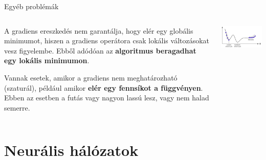 \documentclass[english, aspectratio=169]{beamer}
\makeatletter
\let\origtableofcontents=\tableofcontents
\def\tableofcontents{\@ifnextchar[{\origtableofcontents}{\gobbletableofcontents}}
\def\gobbletableofcontents#1{\origtableofcontents}
\makeatother
\begin{document}
\begin{frame}{Egyéb problémák}
	\begin{columns}
		\begin{column}{.5\textwidth}
			A gradiens ereszkedés nem garantálja, hogy elér egy globális minimumot, hiszen a gradiens operátora csak lokális változásokat vesz figyelembe. Ebből adódóan az \textbf{algoritmus beragadhat egy lokális minimumon}.\par\medskip
			Vannak esetek, amikor a gradiens nem meghatározható (szaturál), például amikor \textbf{elér egy fennsíkot a függvényen}. Ebben az esetben a futás vagy nagyon lassú lesz, vagy nem halad semerre. 
		\end{column}
		\begin{column}{.5\textwidth}
			\begin{center}
				\includegraphics[width=7cm, keepaspectratio]{images/ql_16.png}
			\end{center}
		\end{column}
	\end{columns}
\end{frame}

\section{Neurális hálózatok}

\begin{frame}{}
	\tableofcontents[currentsection]
\end{frame}
\end{document}
